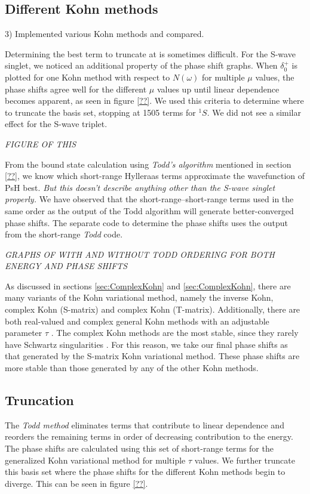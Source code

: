 \documentclass[preprint,showpacs,preprintnumbers,amsmath,amssymb]{revtex4}
\begin{document}
\subsection{Different Kohn methods}
3) Implemented various Kohn methods and compared.

Determining the best term to truncate at is sometimes difficult. For the S-wave singlet, we noticed an additional property of the phase shift graphs. When $\delta_0^+$ is plotted for one Kohn method with respect to $N(\omega)$ for multiple $\mu$ values, the phase shifts agree well for the different $\mu$ values up until linear dependence becomes apparent, as seen in figure \ref{??}. We used this criteria to determine where to truncate the basis set, stopping at 1505 terms for $^1S$. We did not see a similar effect for the S-wave triplet.

\emph{FIGURE OF THIS}

From the bound state calculation using \emph{Todd's algorithm} mentioned in section \ref{??}, we know which short-range Hylleraas terms approximate the wavefunction of PsH best. \emph{But this doesn't describe anything other than the S-wave singlet properly.} We have observed that the short-range--short-range terms used in the same order as the output of the Todd algorithm will generate better-converged phase shifts. The separate code to determine the phase shifts uses the output from the short-range \emph{Todd} code.

\emph{GRAPHS OF WITH AND WITHOUT TODD ORDERING FOR BOTH ENERGY AND PHASE SHIFTS}

As discussed in sections \ref{sec:ComplexKohn} and \ref{sec:ComplexKohn}, there are many variants of the Kohn variational method, namely the inverse Kohn, complex Kohn (S-matrix) and complex Kohn (T-matrix). Additionally, there are both real-valued and complex general Kohn methods with an adjustable parameter $\tau$ \cite{??}. The complex Kohn methods are the most stable, since they rarely have Schwartz singularities \cite{CooperOrLucchese??}. For this reason, we take our final phase shifts as that generated by the S-matrix Kohn variational method. These phase shifts are more stable than those generated by any of the other Kohn methods.

\subsection{Truncation}
\label{sec:Truncation}
The \emph{Todd method} eliminates terms that contribute to linear dependence and reorders the remaining terms in order of decreasing contribution to the energy. The phase shifts are calculated using this set of short-range terms for the generalized Kohn variational method for multiple $\tau$ values. We further truncate this basis set where the phase shifts for the different Kohn methods begin to diverge. This can be seen in figure \ref{??}.
\end{document}
